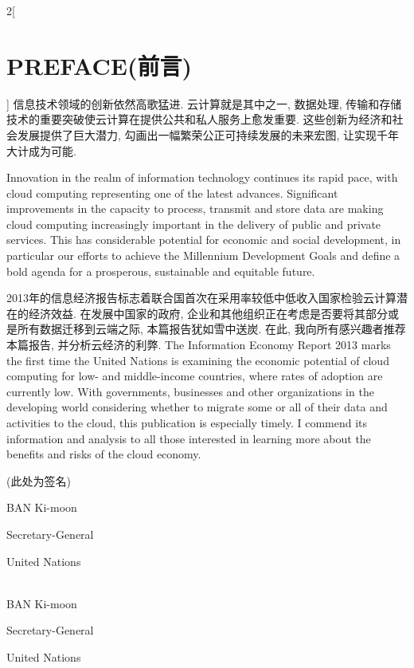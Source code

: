 \documentclass[a4paper, UTF8, 12pt]{article}
\begin{document}
\begin{paracol}{2}[\section{PREFACE(前言)}]
    \switchcolumn*
    信息技术领域的创新依然高歌猛进. 云计算就是其中之一, 数据处理, 传输和存储技术的重要突破使云计算在提供公共和私人服务上愈发重要. 这些创新为经济和社会发展提供了巨大潜力, 勾画出一幅繁荣公正可持续发展的未来宏图, 让实现千年大计成为可能. 

    \switchcolumn   
    Innovation in the realm of information technology continues its rapid pace, with cloud computing representing one of the latest advances. Significant improvements in the capacity to process, transmit and store data are making cloud computing increasingly important in the delivery of public and private services. This has considerable potential for economic and social development, in particular our efforts to achieve the Millennium Development Goals and define a bold agenda for a prosperous, sustainable and equitable future. 

    \switchcolumn*
    2013年的信息经济报告标志着联合国首次在采用率较低中低收入国家检验云计算潜在的经济效益. 在发展中国家的政府, 企业和其他组织正在考虑是否要将其部分或是所有数据迁移到云端之际, 本篇报告犹如雪中送炭. 在此, 我向所有感兴趣者推荐本篇报告, 并分析云经济的利弊.
    \switchcolumn
    The Information Economy Report 2013 marks the first time the United Nations is examining the economic potential of cloud computing for low- and middle-income countries, where rates of adoption are currently low. With governments, businesses and other organizations in the developing world considering whether to migrate some or all of their data and activities to the cloud, this publication is especially timely. I commend its information and analysis to all those interested in learning more about the benefits and risks of the cloud economy.
    \switchcolumn*
    
    \begin{center}
        (此处为签名)

        BAN Ki-moon 
        
        Secretary-General
        
        United Nations
    \end{center}
    \switchcolumn
    \begin{center}
        \hspace{10pt}\\
        BAN Ki-moon 
        
        Secretary-General
        
        United Nations
    \end{center}
    
\end{paracol}
\end{document}
